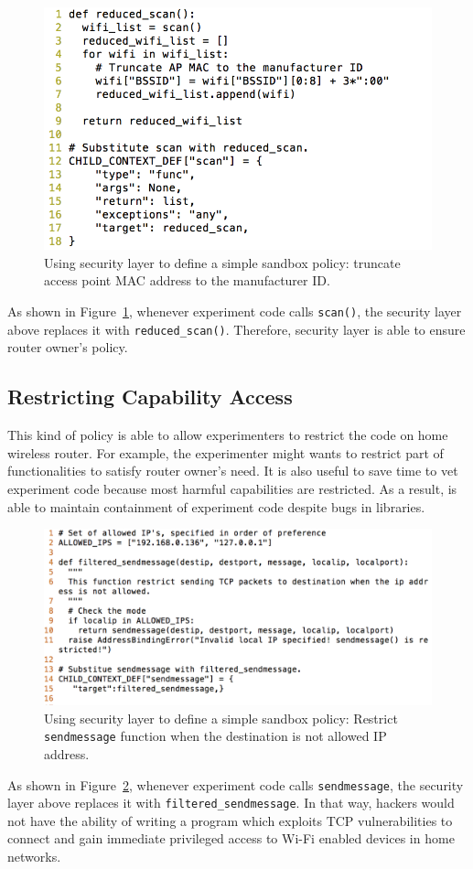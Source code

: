 \begin{figure}%
\centering
\includegraphics[width=0.8\columnwidth]{figure/example.png}
\caption{Using security layer to define a simple sandbox policy: truncate access point MAC address to the manufacturer ID.}
\label{fig-examplecode1}
\end{figure}

As shown in Figure~\ref{fig-examplecode1}, whenever experiment code calls \texttt{scan()}, the security layer above replaces it with \texttt{reduced\_scan()}. Therefore, security layer is able to ensure router owner's policy.

\subsection{Restricting Capability Access}
This kind of policy is able to allow experimenters to restrict the code on home wireless router. For example, the experimenter might wants to restrict part of functionalities to satisfy router owner's need. It is also useful to save time to vet experiment code because most harmful capabilities are restricted. As a result, \sysname is able to maintain containment of experiment code despite bugs in libraries.

\begin{figure}%
\centering
\includegraphics[width=0.8\columnwidth]{figure/example-restrict_data.png}
\caption{Using security layer to define a simple sandbox policy: Restrict \texttt{sendmessage} function when the destination is not allowed IP address.}
\label{fig-examplecode2}
\end{figure}

As shown in Figure~\ref{fig-examplecode2}, whenever experiment code calls \texttt{sendmessage}, the security layer above replaces it with \texttt{filtered\_sendmessage}. In that way, hackers would not have the ability of writing a program which exploits TCP vulnerabilities to connect and gain immediate privileged access to Wi-Fi enabled devices in home networks. 

 